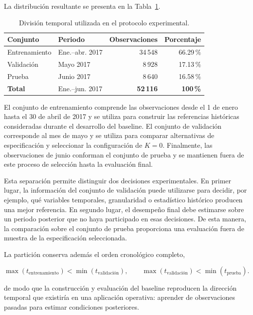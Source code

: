 \documentclass[11pt]{article}
\begin{document}
La distribución resultante se presenta en la Tabla~\ref{tab:division_temporal}.

\begin{table}[htbp]
\centering
\small
\caption{División temporal utilizada en el protocolo experimental.}
\label{tab:division_temporal}
\begin{tabular}{llrr}
\hline
\textbf{Conjunto} &
\textbf{Periodo} &
\textbf{Observaciones} &
\textbf{Porcentaje} \\
\hline
Entrenamiento & Ene.--abr. 2017 & 34\,548 & 66.29\,\% \\
Validación    & Mayo 2017       & 8\,928  & 17.13\,\% \\
Prueba        & Junio 2017      & 8\,640  & 16.58\,\% \\
\hline
\textbf{Total} & Ene.--jun. 2017 & \textbf{52\,116} & \textbf{100\,\%} \\
\hline
\end{tabular}
\end{table}

El conjunto de entrenamiento comprende las observaciones desde el 1 de enero hasta el 30 de abril de 2017 y se utiliza para construir las referencias históricas consideradas durante el desarrollo del baseline. El conjunto de validación corresponde al mes de mayo y se utiliza para comparar alternativas de especificación y seleccionar la configuración de $K=0$. Finalmente, las observaciones de junio conforman el conjunto de prueba y se mantienen fuera de este proceso de selección hasta la evaluación final.

Esta separación permite distinguir dos decisiones experimentales. En primer lugar, la información del conjunto de validación puede utilizarse para decidir, por ejemplo, qué variables temporales, granularidad o estadístico histórico producen una mejor referencia. En segundo lugar, el desempeño final debe estimarse sobre un periodo posterior que no haya participado en esas decisiones. De esta manera, la comparación sobre el conjunto de prueba proporciona una evaluación fuera de muestra de la especificación seleccionada.

La partición conserva además el orden cronológico completo,

\[
\max(t_{\mathrm{entrenamiento}})
<
\min(t_{\mathrm{validación}}),
\qquad
\max(t_{\mathrm{validación}})
<
\min(t_{\mathrm{prueba}}).
\]

de modo que la construcción y evaluación del baseline reproducen la dirección temporal que existiría en una aplicación operativa: aprender de observaciones pasadas para estimar condiciones posteriores.
\end{document}
